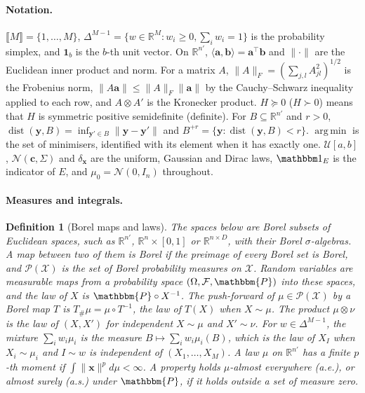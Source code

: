 \documentclass{article}
\DeclareMathOperator*{\argmin}{arg\,min}
\DeclareMathOperator{\dist}{dist}
\newcommand{\RR}{\mathbb{R}}
\newcommand{\PP}{\mathbbm{P}}
\newcommand{\cN}{\mathcal{N}}
\newcommand{\bx}{\mathbf{x}}
\newcommand{\by}{\mathbf{y}}
\newcommand{\bb}{\mathbf{b}}
\newcommand{\ba}{\mathbf{a}}
\theoremstyle{plain}
\newtheorem{definition}[theorem]{Definition}
\theoremstyle{remark}
\begin{document}
\paragraph{Notation.}
$\llbracket M\rrbracket=\{1,\dots,M\}$, $\Delta^{M-1}=\{w\in\RR^M:w_i\ge0,\sum_iw_i=1\}$ is the probability simplex, and $\mathbf 1_b$ is the
$b$-th unit vector. On $\RR^{n'}$, $\langle\ba,\bb\rangle=\ba^\top\bb$ and $\|\cdot\|$ are the Euclidean inner product and norm. For a matrix
$A$, $\|A\|_F=(\sum_{j,l}A_{jl}^2)^{1/2}$ is the Frobenius norm, $\|A\ba\|\le\|A\|_F\|\ba\|$ by the Cauchy--Schwarz inequality applied to each
row, and $A\otimes A'$ is the Kronecker product. $H\succeq0$ ($H\succ0$) means that $H$ is symmetric positive semidefinite (definite). For
$B\subseteq\RR^{n'}$ and $r>0$, $\dist(\by,B)=\inf_{\by'\in B}\|\by-\by'\|$ and $B^{+r}=\{\by:\dist(\by,B)<r\}$. $\argmin$ is the set of
minimisers, identified with its element when it has exactly one. $\mathcal U[a,b]$, $\cN(\mathbf c,\Sigma)$ and $\delta_\bx$ are the uniform,
Gaussian and Dirac laws, $\mathbbm 1_E$ is the indicator of $E$, and $\mu_0=\cN(0,I_n)$ throughout.

\paragraph{Measures and integrals.}

\begin{definition}[Borel maps and laws]\label{def:borel}
The spaces below are Borel subsets of Euclidean spaces, such as $\RR^{n'}$, $\RR^n\times[0,1]$ or $\RR^{n\times D}$, with their Borel
$\sigma$-algebras. A map between two of them is \emph{Borel} if the preimage of every Borel set is Borel, and $\mathcal P(\mathcal X)$ is the set
of Borel probability measures on $\mathcal X$. Random variables are measurable maps from a probability space $(\Omega,\mathcal F,\PP)$ into
these spaces, and the \emph{law} of $X$ is $\PP\circ X^{-1}$. The \emph{push-forward} of $\mu\in\mathcal P(\mathcal X)$ by a Borel map $T$ is
$T_\#\mu=\mu\circ T^{-1}$, the law of $T(X)$ when $X\sim\mu$. The \emph{product} $\mu\otimes\nu$ is the law of $(X,X')$ for independent $X\sim\mu$
and $X'\sim\nu$. For $w\in\Delta^{M-1}$, the \emph{mixture} $\sum_iw_i\mu_i$ is the measure $B\mapsto\sum_iw_i\mu_i(B)$, which is the law of $X_I$
when $X_i\sim\mu_i$ and $I\sim w$ is independent of $(X_1,\dots,X_M)$. A law $\mu$ on $\RR^{n'}$ has a \emph{finite $p$-th moment} if
$\int\|\bx\|^pd\mu<\infty$. A property holds $\mu$-\emph{almost everywhere} (a.e.), or \emph{almost surely} (a.s.) under $\PP$, if it holds
outside a set of measure zero.
\end{definition}
\end{document}
